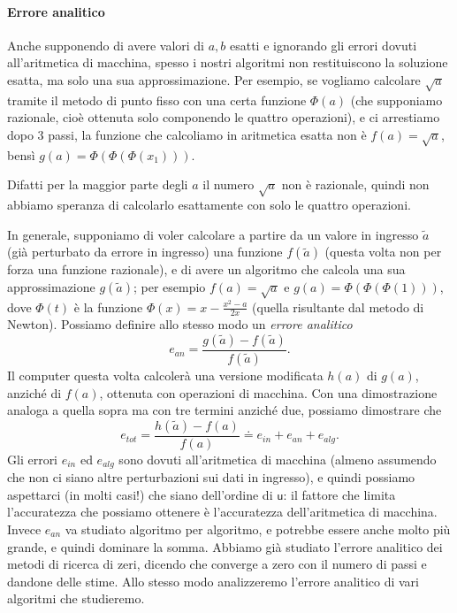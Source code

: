 \documentclass[a4paper]{report}
\theoremstyle{definiton}
\theoremstyle{remark}
\begin{document}
\paragraph{Errore analitico}
Anche supponendo di avere valori di $a,b$ esatti e ignorando gli errori dovuti all'aritmetica di macchina, spesso i nostri algoritmi non restituiscono la soluzione esatta, ma solo una sua approssimazione. Per esempio, se vogliamo calcolare $\sqrt{a}$ tramite il metodo di punto fisso con una certa funzione $\Phi(a)$ (che supponiamo razionale, cioè ottenuta solo componendo le quattro operazioni), e ci arrestiamo dopo 3 passi, la funzione che calcoliamo in aritmetica esatta non è $f(a) = \sqrt{a}$, bensì $g(a) = \Phi(\Phi(\Phi(x_1)))$.

Difatti per la maggior parte degli $a$ il numero $\sqrt{a}$ non è razionale, quindi non abbiamo speranza di calcolarlo esattamente con solo le quattro operazioni.

In generale, supponiamo di voler calcolare a partire da un valore in ingresso $\tilde{a}$ (già perturbato da errore in ingresso) una funzione $f(\tilde{a})$ (questa volta non per forza una funzione razionale), e di avere un algoritmo che calcola una sua approssimazione $g(\tilde{a})$; per esempio $f(a) = \sqrt{a}$ e $g(a) = \Phi(
\Phi(\Phi(1)))$, dove $\Phi(t)$ è la funzione $\Phi(x) = x - \frac{x^2-a}{2x}$ (quella risultante dal metodo di Newton). Possiamo definire allo stesso modo un \emph{errore analitico}
\[
e_{an} = \frac{g(\tilde{a}) - f(\tilde{a})}{f(\tilde{a})}.
\]
Il computer questa volta calcolerà una versione modificata $h(a)$ di $g(a)$, anziché di $f(a)$, ottenuta con operazioni di macchina.
Con una dimostrazione analoga a quella sopra ma con tre termini anziché due, possiamo dimostrare che
\[
e_{tot} = \frac{h(\tilde{a}) - f(a)}{f(a)} \doteq e_{in} + e_{an} + e_{alg}.
\]
Gli errori $e_{in}$ ed $e_{alg}$ sono dovuti all'aritmetica di macchina (almeno assumendo che non ci siano altre perturbazioni sui dati in ingresso), e quindi possiamo aspettarci (in molti casi!) che siano dell'ordine di $\mathsf{u}$: il fattore che limita l'accuratezza che possiamo ottenere è l'accuratezza dell'aritmetica di macchina. Invece $e_{an}$ va studiato algoritmo per algoritmo, e potrebbe essere anche molto più grande, e quindi dominare la somma. Abbiamo già studiato l'errore analitico dei metodi di ricerca di zeri, dicendo che converge a zero con il numero di passi e dandone delle stime. Allo stesso modo analizzeremo l'errore analitico di vari algoritmi che studieremo.
\end{document}
